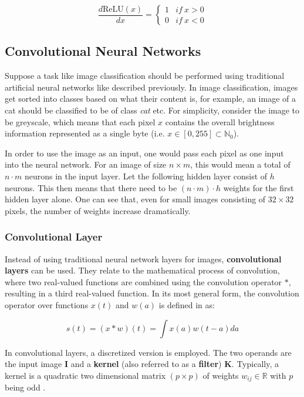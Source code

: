 \begin{equation}
    \frac{d \text{ReLU}(x)}{dx} = \begin{cases}
        1 & if ~ x > 0 \\
        0 & if ~ x < 0
    \end{cases}
\end{equation}

\subsection{Convolutional Neural Networks}
Suppose a task like image classification should be performed using traditional artificial neural networks like described previously.
In image classification, images get sorted into classes based on what their content is, for example, an image of a cat should be classified to be of class \textit{cat} etc.
For simplicity, consider the image to be greyscale, which means that each pixel $x$ contains the overall brightness information represented as a single byte (i.e. $x \in [0,255] \subset \mathbb{N}_0$).

In order to use the image as an input, one would pass each pixel as one input into the neural network.
For an image of size $n \times m$, this would mean a total of $n \cdot m$ neurons in the input layer.
Let the following hidden layer consist of $h$ neurons.
This then means that there need to be $(n \cdot m) \cdot h$ weights for the first hidden layer alone.
One can see that, even for small images consisting of $32 \times 32$ pixels, the number of weights increase dramatically.

\subsubsection{Convolutional Layer}

Instead of using traditional neural network layers for images, \textbf{convolutional layers} can be used.
They relate to the mathematical process of convolution, where two real-valued functions are combined using the convolution operator $*$, resulting in a third real-valued function.
In its most general form, the convolution operator over functions $x(t)$ and $w(a)$ is defined in \cite{goodfellow_deep_2016} as:

\begin{equation}
    s(t) = (x * w)(t) = \int x(a)w(t-a)da
\end{equation}

In convolutional layers, a discretized version is employed.
The two operands are the input image $\bm{I}$ and a \textbf{kernel} (also referred to as a \textbf{filter}) $\bm{K}$.
Typically, a kernel is a quadratic two dimensional matrix $(p \times p)$ of weights $w_{ij} \in \mathbb{R}$ with $p$ being odd .

